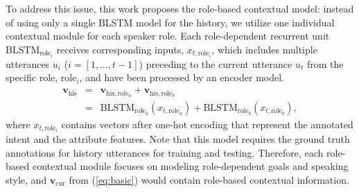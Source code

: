 \documentclass{article}
\begin{document}
To address this issue, this work proposes the role-based contextual model: instead of using only a single BLSTM model for the history, we utilize one individual contextual module for each speaker role.
Each role-dependent recurrent unit $\text{BLSTM}_{\text{role}_i}$ receives corresponding inputs, $x_{t,\text{role}_i}$, which includes multiple utterances $u_i$ ($i=[1, ..., t-1]$) preceding to the current utterance $u_t$ from the specific role, $\text{role}_i$, and have been processed by an encoder model.
\begin{eqnarray}
\label{eq:tag2}
\textbf{v}_\text{his} &=& \textbf{v}_{\text{his}, \text{role}_a} + \textbf{v}_{\text{his}, \text{role}_b}\\
&=& \text{BLSTM}_{\text{role}_a}(x_{t,\text{role}_a}) + \text{BLSTM}_{\text{role}_b}(x_{t,\text{role}_b}),\nonumber
\end{eqnarray}
where $x_{t, \text{role}_i}$ contains vectors after one-hot encoding that represent the annotated intent and the attribute features.
Note that this model requires the ground truth annotations for history utterances for training and testing.
Therefore, each role-based contextual module focuses on modeling role-dependent goals and speaking style, and $\textbf{v}_\text{cur}$ from (\ref{eq:basic}) would contain role-based contextual information.
\end{document}
